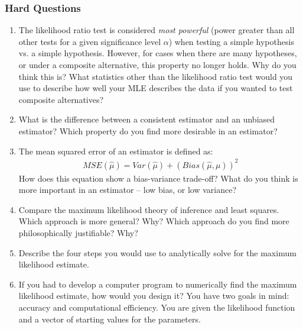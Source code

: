 \documentclass[11pt]{article}
\begin{document}
\subsubsection{Hard Questions}
\begin{enumerate}
\item The likelihood ratio test is considered \emph{most powerful} (power greater than all other tests for a given significance level $\alpha$)  when testing a simple hypothesis vs. a simple hypothesis.  However, for cases when there are many hypotheses, or under a composite alternative, this property no longer holds.  Why do you think this is?  What statistics other than the likelihood ratio test would you use to describe how well your MLE describes the data if you wanted to test composite alternatives? 
 
 \item What is the difference between a consistent estimator and an unbiased estimator?  Which property do you find more desirable in an estimator? 
 
 \item The mean squared error of an estimator is defined as:
 \begin{eqnarray*}
 MSE(\hat{\mu}) = Var(\hat{\mu}) + \left(Bias(\hat{\mu}, \mu)\right)^2 
 \end{eqnarray*}
 How does this equation show a bias-variance trade-off?  What do you think is more important in an estimator -- low bias, or low variance? 
 
 \item Compare the maximum likelihood theory of inference and least squares.  Which approach is more general?  Why?  Which approach do you find more philosophically justifiable?  Why? 
 
 \item Describe the four steps you would use to analytically solve for the maximum likelihood estimate. 
 
 \item If you had to develop a computer program to numerically find the maximum likelihood estimate, how would you design it?  You have two goals in mind: accuracy and computational efficiency. You are given the likelihood function and a vector of starting values for the parameters. 
  

\end{enumerate}
\end{document}
